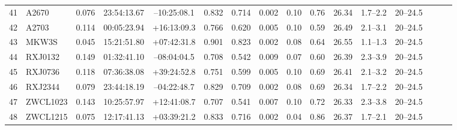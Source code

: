 \documentclass[useAMS,usenatbib]{mnras}
\begin{document}
\begin{table}
\begin{tabular*}{1.0\textwidth}{ l l c c c r c c c c c c c c l l }
41 & A2670 & 0.076 & 23:54:13.67 & \hspace{1.5pt}--\hspace{0.5pt}10:25:08.1 & 0.832 & 0.714 & 0.002 \hspace{8pt}& 0.10 & 0.76 & 26.34 \hspace{8pt}& 1.7--2.2 \hspace{8pt}& 20--24.5 \\
42 & A2703 & 0.114 & 00:05:23.94 & +16:13:09.3 & 0.766 & 0.620 & 0.005 \hspace{8pt}& 0.10 & 0.59 & 26.49 \hspace{8pt}& 2.1--3.1 \hspace{8pt}& 20--24.5 \\
43 & MKW3S & 0.045 & 15:21:51.80 & +07:42:31.8 & 0.901 & 0.823 & 0.002 \hspace{8pt}& 0.08 & 0.64 & 26.55 \hspace{8pt}& 1.1--1.3 \hspace{8pt}& 20--24.5 \\
44 & RXJ0132 & 0.149 & 01:32:41.10 & \hspace{1.5pt}--\hspace{0.5pt}08:04:04.5 & 0.708 & 0.542 & 0.009 \hspace{8pt}& 0.07 & 0.60 & 26.39 \hspace{8pt}& 2.3--3.9 \hspace{8pt}& 20--24.5 \\
45 & RXJ0736 & 0.118 & 07:36:38.08 & +39:24:52.8 & 0.751 & 0.599 & 0.005 \hspace{8pt}& 0.10 & 0.69 & 26.41 \hspace{8pt}& 2.1--3.2 \hspace{8pt}& 20--24.5 \\
46 & RXJ2344 & 0.079 & 23:44:18.19 & \hspace{1.5pt}--\hspace{0.5pt}04:22:48.7 & 0.829 & 0.709 & 0.002 \hspace{8pt}& 0.08 & 0.69 & 26.34 \hspace{8pt}& 1.7--2.2 \hspace{8pt}& 20--24.5 \\
47 & ZWCL1023 & 0.143 & 10:25:57.97 & +12:41:08.7 & 0.707 & 0.541 & 0.007 \hspace{8pt}& 0.10 & 0.72 & 26.33 \hspace{8pt}& 2.3--3.8 \hspace{8pt}& 20--24.5 \\
48 & ZWCL1215 & 0.075 & 12:17:41.13 & +03:39:21.2 & 0.833 & 0.716 & 0.002 \hspace{8pt}& 0.04 & 0.86 & 26.37 \hspace{8pt}& 1.7--2.1 \hspace{8pt}& 20--24.5 \\

\end{tabular*}
\end{table}
\end{document}
